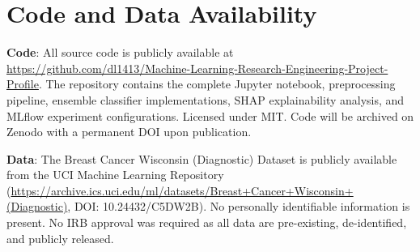 \documentclass[10pt,letterpaper]{article}
\begin{document}
\section*{Code and Data Availability}
\label{sec:availability}

\textbf{Code}: All source code is publicly available at
\url{https://github.com/dl1413/Machine-Learning-Research-Engineering-Project-Profile}.
The repository contains the complete Jupyter notebook, preprocessing pipeline, ensemble
classifier implementations, SHAP explainability analysis, and MLflow experiment configurations.
Licensed under MIT. Code will be archived on Zenodo with a permanent DOI upon publication.

\textbf{Data}: The Breast Cancer Wisconsin (Diagnostic) Dataset is publicly available from the
UCI Machine Learning Repository (\url{https://archive.ics.uci.edu/ml/datasets/Breast+Cancer+Wisconsin+(Diagnostic)},
DOI: 10.24432/C5DW2B). No personally identifiable information is present. No IRB approval was
required as all data are pre-existing, de-identified, and publicly released.
\end{document}
